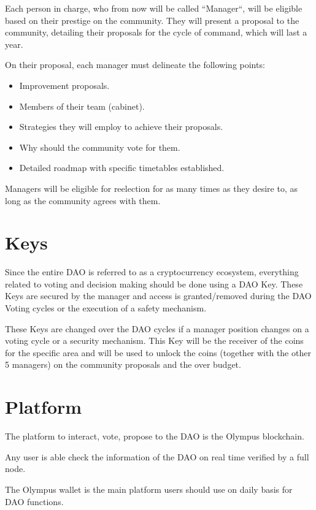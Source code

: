 \documentclass{article}
\begin{document}
Each person in charge, who from now will be called ``Manager``, will be eligible based on their prestige on the community. They will present a proposal to the community, detailing their proposals for the cycle of command, which will last a year.

On their proposal, each manager must delineate the following points:

\begin{itemize}
  \item Improvement proposals.
  \item Members of their team (cabinet).
  \item Strategies they will employ to achieve their proposals.
  \item Why should the community vote for them.
  \item Detailed roadmap with specific timetables established.
\end{itemize}

Managers will be eligible for reelection for as many times as they desire to, as long as the community agrees with them.

\section{Keys}

Since the entire DAO is referred to as a cryptocurrency ecosystem, everything related to voting and decision making should be done using a DAO Key. These Keys are secured by the manager and access is granted/removed during the DAO Voting cycles or the execution of a safety mechanism.

These Keys are changed over the DAO cycles if a manager position changes on a voting cycle or a security mechanism. This Key will be the receiver of the coins for the specific area and will be used to unlock the coins (together with the other 5 managers) on the community proposals and the over budget.

\section{Platform}

The platform to interact, vote, propose to the DAO is the Olympus blockchain.

Any user is able check the information of the DAO on real time verified by a full node. 

The Olympus wallet is the main platform users should use on daily basis for DAO functions.
\end{document}
